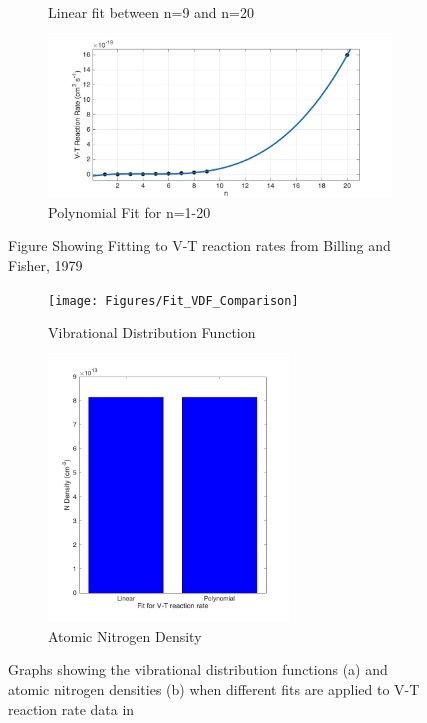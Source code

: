 \documentclass[11pt, oneside]{article}   	%
\begin{document}
\begin{figure}
\begin{subfigure}{0.5\textwidth}
\caption{Linear fit between n=9 and n=20}
\end{subfigure}
\begin{subfigure}{0.5\textwidth}
\includegraphics[width=\textwidth]{Figures/Polynomial}
\caption{Polynomial Fit for n=1-20}
\end{subfigure}
\caption{Figure Showing Fitting to V-T reaction rates from Billing and Fisher, 1979 \cite{Billing1979vv}}
\label{fig:fits}
\end{figure}

\begin{figure}
\begin{subfigure}{0.5\textwidth}
\texttt{[image: Figures/Fit\_VDF\_Comparison]}
\caption{Vibrational Distribution Function}
\label{subfig:VDF}
\end{subfigure}
\begin{subfigure}{0.5\textwidth}
\begin{center}
\includegraphics[width=0.7\textwidth]{Figures/Ndensity}
\caption{Atomic Nitrogen Density}
\end{center}
\end{subfigure}
\caption{Graphs showing the vibrational distribution functions (a) and atomic nitrogen densities (b) when different fits are applied to V-T reaction rate data in \cite{Billing1979vv}}
\label{fig:VDFandN}
\end{figure}
\end{document}
